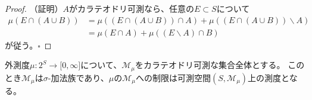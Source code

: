\documentclass[../root.tex]{subfiles}
\begin{document}
\begin{proof}{}{}
（証明）$ A $がカラテオドリ可測なら、任意の$ E\subset S $について
\begin{align*}
\mu( E\cap( A\cup B ) ) &= \mu( ( E\cap( A\cup B ) )\cap A ) + \mu( ( E\cap( A\cup B ) )\backslash A ) \\
&= \mu( E\cap A )+\mu( ( E\backslash A )\cap B )
\end{align*}
が従う。$ \square $
\end{proof}

\begin{Thm}{}{}
外測度$ \mu\colon 2^{S}\rightarrow\lbrack 0, \infty \rbrack $について、$ \mathscr{M}_{\mu} $をカラテオドリ可測な集合全体とする。
このとき$ \mathscr{M}_{\mu} $は$ \sigma $-加法族であり、$ \mu $の$ \mathscr{M}_{\mu} $への制限は可測空間$ ( S, \mathscr{M}_{\mu} ) $上の測度となる。
\end{Thm}
\end{document}
